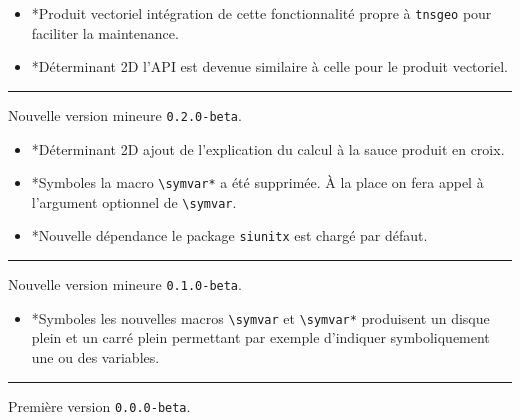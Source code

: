 \documentclass[12pt,a4paper]{article}
\makeatletter
\newcommand\env[1]{\texttt{#1}}
\newcommand\macro[1]{\env{\textbackslash{}#1}}
\theoremstyle{definition}
\newcommand\separation{
	\medskip
	\hfill\rule{0.5\textwidth}{0.75pt}\hfill
	\medskip
}
\newcommand\topic{\@ifstar{\@topic@star}{\@topic@no@star}}
\newcommand\@topic@no@star[1]{%
	\textbf{\textsc{#1}.}%
}
\newcommand\@topic@star[1]{%
	\textbf{\textsc{#1} :}%
}
\makeatother
\begin{document}
{{{{{{{{{{{\begin{description}
    \begin{itemize}[itemsep=.5em]
        \item \topic*{Produit vectoriel} intégration de cette fonctionnalité propre à \verb#tnsgeo#  pour faciliter la maintenance.
    
    
        \item \topic*{Déterminant 2D} l'API est devenue similaire à celle pour le produit vectoriel.
    \end{itemize}
    
    \separation


    \medskip
    \item[2020-07-29] Nouvelle version mineure \verb+0.2.0-beta+.
    
    \begin{itemize}[itemsep=.5em]
        \item \topic*{Déterminant 2D} ajout de l'explication du calcul à la sauce produit en croix.
    
    
        \item \topic*{Symboles} la macro \macro{symvar*} a été supprimée. À la place on fera appel à l'argument optionnel de \macro{symvar}.
    
    
        \item \topic*{Nouvelle dépendance} le package \verb#siunitx# est chargé par défaut.
    \end{itemize}
    
    \separation


    \medskip
    \item[2020-07-15] Nouvelle version mineure \verb+0.1.0-beta+.
    
    \begin{itemize}[itemsep=.5em]
        \item \topic*{Symboles} les nouvelles macros \macro{symvar} et \macro{symvar*} produisent un disque plein et un carré plein permettant par exemple d'indiquer symboliquement une ou des variables.
    \end{itemize}
    
    \separation


    \medskip
    \item[2020-07-10] Première version \verb+0.0.0-beta+.


\end{description}}}}}}}}}}}}
\end{document}
